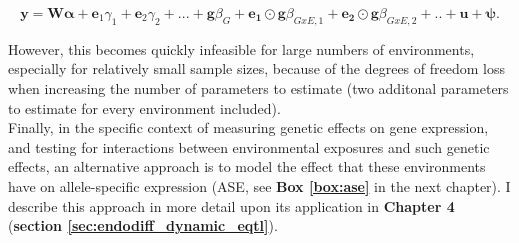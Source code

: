 \begin{equation}\label{eq:multi_interaction_test_FE_LMM}
 \mathbf{y} =  \mathbf{W}\boldsymbol{\alpha} + \mathbf{e}_1\gamma_1 + \mathbf{e}_2\gamma_2 + ...  + \mathbf{g}\beta_G + \mathbf{e_1}\odot\mathbf{g}\beta_{GxE,1}+ \mathbf{e_2}\odot\mathbf{g}\beta_{GxE,2} + .. + \mathbf{u} + \boldsymbol{\psi}. 
\end{equation}

However, this becomes quickly infeasible for large numbers of environments, especially for relatively small sample sizes, because of the degrees of freedom loss when increasing the number of parameters to estimate (two additonal parameters to estimate for every environment included). \\

Finally, in the specific context of measuring genetic effects on gene expression, and testing for interactions between environmental exposures and such genetic effects, an alternative approach is to model the effect that these environments have on allele-specific expression (ASE, see \textbf{Box \ref{box:ase}} in the next chapter).
I describe this approach in more detail upon its application in \textbf{Chapter 4} (\textbf{section \ref{sec:endodiff_dynamic_eqtl}}).





